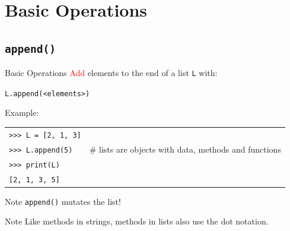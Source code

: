 \documentclass[t,handout,9pt]{beamer}
\begin{document}
\section{Basic Operations}
\subsection{\texttt{append()}}
\begin{frame}{Basic Operations}
\vfill
\textcolor{red}{Add} elements to the end of a list \texttt{L} with:
\begin{center}
	\texttt{L.append(<elements>)}
\end{center}
\vfill
Example:
\begin{table}[]
\begin{flushleft}
\begin{tabular}{ll}
\texttt{>{}>{}> L = [2, 1, 3]} &  \\
\texttt{>{}>{}> L.append(5)} &  \# lists are objects with data, methods and functions\\
\texttt{>{}>{}> print(L)} &  \\
\texttt{[2, 1, 3, 5]} &  \\
\end{tabular}
\end{flushleft}
\end{table}
\vfill
\begin{block}{Note}
\texttt{append()} mutates the list!
\end{block}
\begin{block}{Note}
Like methods in strings, methods in lists also use the dot notation.
\end{block}
\vfill
\end{frame}
%
\end{document}
